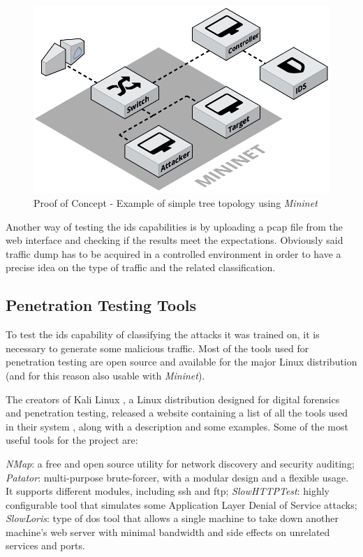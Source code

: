 \begin{figure}[h!]
    \centering
    \includegraphics[scale=0.25]{assets/figures/chapter3/PoC_topology.png}
    \caption{Proof of Concept - Example of simple tree topology using \textit{Mininet}}
    \label{fig:poc-topology}
\end{figure}
Another way of testing the \gls{ids} capabilities is by uploading a \gls{pcap} file from the web interface and checking if the results meet the expectations. Obviously said traffic dump has to be acquired in a controlled environment in order to have a precise idea on the type of traffic and the related classification.


\subsection{Penetration Testing Tools}
\label{subsec:pentesting-tools}
To test the \gls{ids} capability of classifying the attacks it was trained on, it is necessary to generate some malicious traffic. Most of the tools used for penetration testing are open source and available for the major Linux distribution (and for this reason also usable with \textit{Mininet}). 
\par The creators of Kali Linux \cite{KaliLinuxWebsite}, a  Linux distribution designed for digital forensics and penetration testing, released a website containing a list of all the tools used in their system \cite{KaliToolsWebsite}, along with a description and some examples. Some of the most useful tools for the project are:

\begin{itemize}
  \itemAR \textit{NMap}: a free and open source utility for network discovery and security auditing;
  \itemAR \textit{Patator}: multi-purpose brute-forcer, with a modular design and a flexible usage. It supports different modules, including \gls{ssh} and \gls{ftp};
  \itemAR \textit{SlowHTTPTest}: highly configurable tool that simulates some Application Layer Denial of Service attacks;
  \itemAR \textit{SlowLoris}: type of \gls{dos} tool that allows a single machine to take down another machine's web server with minimal bandwidth and side effects on unrelated services and ports.
\end{itemize}

